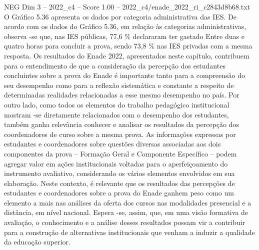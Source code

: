 \begin{textsample}{NEG Dim 3 – 2022\_c4 – Score 1.00 – 2022\_c4/enade\_2022\_ri\_c2843d8b68.txt}
O Gráfico 5.36 apresenta os dados por categoria administrativa das IES.
De acordo com os dados do Gráfico 5.36, em relação às categorias administrativas, observa -se que, nas IES públicas, 77,6 \% declararam ter gastado Entre duas e quatro horas para concluir a prova, sendo 73,8 \% nas IES privadas com a mesma resposta.
Os resultados do Enade 2022, apresentados neste capítulo, contribuem para o entendimento de que a consideração da percepção dos estudantes concluintes sobre a prova do Enade é importante tanto para a compreensão do seu desempenho como para a reflexão sistemática e constante a respeito de determinadas realidades relacionadas a esse mesmo desempenho no país.
Por outro lado, como todos os elementos do trabalho pedagógico institucional mostram -se diretamente relacionados com o desempenho dos estudantes, também ganha relevância conhecer e analisar os resultados da percepção dos coordenadores de curso sobre a mesma prova.
As informações expressas por estudantes e coordenadores sobre questões diversas associadas aos dois componentes da prova – Formação Geral e Componente Específico – podem agregar valor em ações institucionais voltadas para o aperfeiçoamento do instrumento avaliativo, considerando os vários elementos envolvidos em sua elaboração.
Neste contexto, é relevante que os resultados das percepções de estudantes e coordenadores sobre a prova do Enade ganhem peso como um elemento a mais nas análises da oferta dos cursos nas modalidades presencial e a distância, em nível nacional.
Espera -se, assim, que, em uma visão formativa de avaliação, o conhecimento e a análise desses resultados possam vir a contribuir para a construção de alternativas institucionais que venham a induzir a qualidade da educação superior.

\end{textsample}
